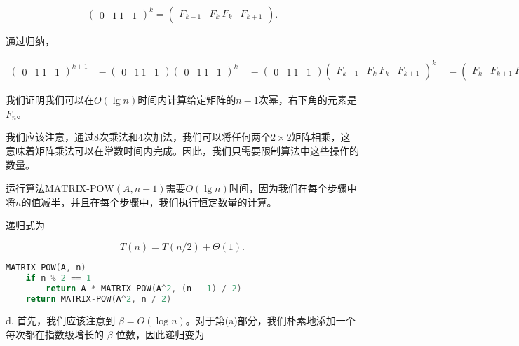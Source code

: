 \documentclass[a4paper, justified]{tufte-handout}
\begin{document}
\begin{solution}
  $$ \begin{pmatrix} 0 & 1 \ 1 & 1 \end{pmatrix}^k = \begin{pmatrix} F_{k - 1} & F_k \ F_k & F_{k + 1} \end{pmatrix} . $$

  通过归纳，

  $$ \begin{aligned} \begin{pmatrix} 0 & 1 \ 1 & 1 \end{pmatrix}^{k + 1} & = \begin{pmatrix} 0 & 1 \ 1 & 1 \end{pmatrix} \begin{pmatrix} 0 & 1 \ 1 & 1 \end{pmatrix}^k \ & = \begin{pmatrix} 0 & 1 \ 1 & 1 \end{pmatrix} \begin{pmatrix} F_{k - 1} & F_k \ F_k & F_{k + 1} \end{pmatrix}^k \ & = \begin{pmatrix} F_k & F_{k + 1} \ F_{k - 1} + F_k & F_k + F_{k + 1} \end{pmatrix} \ & = \begin{pmatrix} F_k & F_{k + 1} \ F_{k + 1} & F_{k + 2} \end{pmatrix}. \end{aligned} $$

  我们证明我们可以在$O(\lg n)$时间内计算给定矩阵的$n-1$次幂，右下角的元素是$F_n$。

  我们应该注意，通过8次乘法和4次加法，我们可以将任何两个$2\times2$矩阵相乘，这意味着矩阵乘法可以在常数时间内完成。因此，我们只需要限制算法中这些操作的数量。

  运行算法$\text{MATRIX-POW}(A,n-1)$需要$O(\lg n)$时间，因为我们在每个步骤中将$n$的值减半，并且在每个步骤中，我们执行恒定数量的计算。

  递归式为

  $$T(n) = T(n / 2) + \Theta(1).$$

  \begin{lstlisting}[language=C++,style=style1]
    MATRIX-POW(A, n)
    if n % 2 == 1
        return A * MATRIX-POW(A^2, (n - 1) / 2)
    return MATRIX-POW(A^2, n / 2)

\end{lstlisting}

  d. 首先，我们应该注意到 $\beta = O(\log n)$。对于第(a)部分，我们朴素地添加一个每次都在指数级增长的 $\beta$ 位数，因此递归变为


\end{solution}
\end{document}
